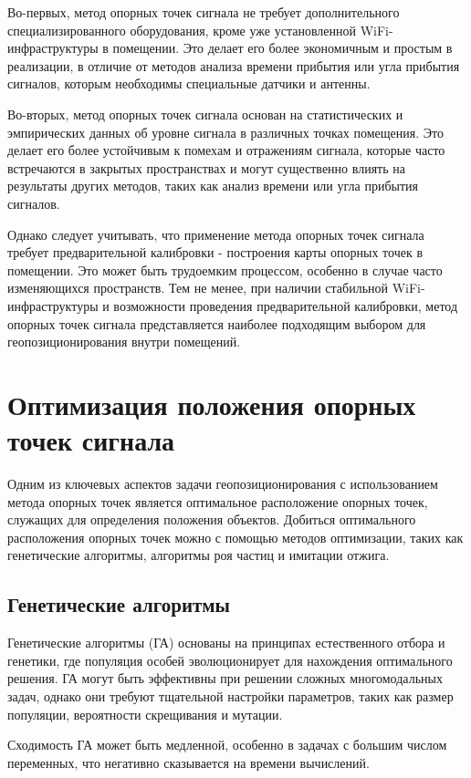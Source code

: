 Во-первых, метод опорных точек сигнала не требует дополнительного специализированного оборудования, кроме уже установленной WiFi-инфраструктуры в помещении. Это делает его более экономичным и простым в реализации, в отличие от методов анализа времени прибытия или угла прибытия сигналов, которым необходимы специальные датчики и антенны.

Во-вторых, метод опорных точек сигнала основан на статистических и эмпирических данных об уровне сигнала в различных точках помещения. Это делает его более устойчивым к помехам и отражениям сигнала, которые часто встречаются в закрытых пространствах и могут существенно влиять на результаты других методов, таких как анализ времени или угла прибытия сигналов.

Однако следует учитывать, что применение метода опорных точек сигнала требует предварительной калибровки - построения карты опорных точек в помещении. Это может быть трудоемким процессом, особенно в случае часто изменяющихся пространств. Тем не менее, при наличии стабильной WiFi-инфраструктуры и возможности проведения предварительной калибровки, метод опорных точек сигнала представляется наиболее подходящим выбором для геопозиционирования внутри помещений.

\section{Оптимизация положения опорных точек сигнала}

Одним из ключевых аспектов задачи геопозиционирования с использованием метода опорных точек является оптимальное расположение опорных точек, служащих для определения положения объектов. Добиться оптимального расположения опорных точек можно с помощью методов оптимизации, таких как генетические алгоритмы, алгоритмы роя частиц и имитации отжига.

\subsection{Генетические алгоритмы}

Генетические алгоритмы (ГА) основаны на принципах естественного отбора и генетики, где популяция особей эволюционирует для нахождения оптимального решения.
ГА могут быть эффективны при решении сложных многомодальных задач, однако они требуют тщательной настройки параметров, таких как размер популяции, вероятности скрещивания и мутации.

Сходимость ГА может быть медленной, особенно в задачах с большим числом переменных, что негативно сказывается на времени вычислений.

